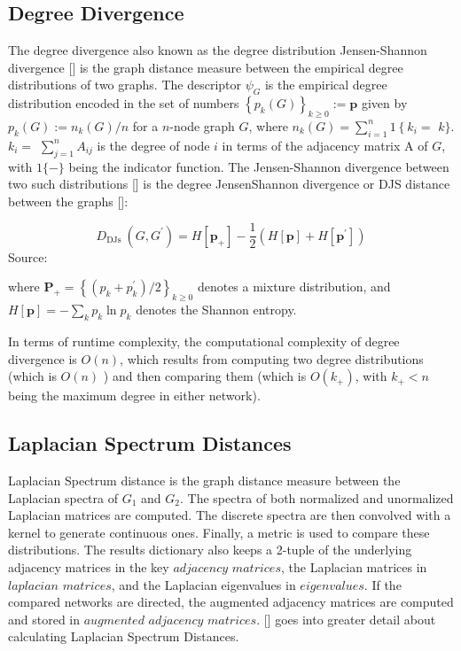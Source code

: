 \subsection{Degree Divergence}
The degree divergence also known as the degree distribution Jensen-Shannon divergence [\cite{Lin:1991}] is the graph distance measure between the empirical degree distributions of two graphs. The descriptor $\psi_{G}$ is the empirical degree distribution encoded in the set of numbers $\left\{p_{k}(G)\right\}_{k \geq 0}:=\mathbf{p}$ given by $p_{k}(G):=n_{k}(G) /n$ for a $n$-node graph $G$, where $n_{k}(G)=\sum_{i=1}^{n} 1\left\{k_{i}=\right.$ $k\}$. $k_{i}=$ $\sum_{j=1}^{n} A_{i j}$ is the degree of node $i$ in terms of the adjacency matrix A of $G$, with $1\{-\}$ being the indicator function.  The Jensen-Shannon divergence between two such distributions [\cite{Carpi:2011}] is the degree JensenShannon divergence or DJS distance between the graphs [\cite{Tsitsulin:2018}]:

\begin{equation}
D_{\text {DJs }}\left(G, G^{\prime}\right)=H\left[\mathbf{p}_{+}\right]-\frac{1}{2}\left(H[\mathbf{p}]+H\left[\mathbf{p}^{\prime}\right]\right)
\end{equation}
Source: \cite{Tsitsulin:2018}

where $\mathbf{P}_{+}=\left\{\left(p_{k}+p_{k}^{\prime}\right) / 2\right\}_{k \geq 0}$ denotes a mixture distribution, and $H[\mathbf{p}]=-\sum_{k} p_{k} \ln p_{k}$ denotes the Shannon entropy. 

In terms of runtime complexity, the computational complexity of degree divergence is $O(n)$, which results from computing two degree distributions (which is $O(n)$ ) and then comparing them (which is $O\left(k_{+}\right)$, with $k_{+}<n$ being the maximum degree in either network)\cite{Tsitsulin:2018}.

\subsection{Laplacian Spectrum Distances}
Laplacian Spectrum distance is the graph distance measure between the Laplacian spectra of $G_1$ and ${G_2}$. The spectra of both normalized and unormalized Laplacian matrices are computed. The discrete spectra are then convolved with a kernel to generate continuous ones. Finally, a metric is used to compare these distributions. The results dictionary also keeps a 2-tuple of the underlying adjacency matrices in the key $adjacency$ $matrices$, the Laplacian matrices in $laplacian$ $matrices$, and the Laplacian eigenvalues in $eigenvalues$. If the compared networks are directed, the augmented adjacency matrices are computed and stored in $augmented$ $adjacency$ $matrices$. [\cite{Tsitsulin:2018}] goes into greater detail about calculating Laplacian Spectrum Distances.


